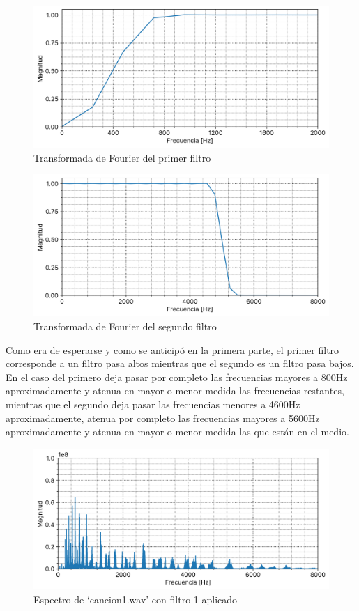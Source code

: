\documentclass[12pt]{article}
\begin{document}
\begin{figure}[H]
\centering
\includegraphics{plot/filter1_h_fft.png}
\caption{Transformada de Fourier del primer filtro}
\label{filter1_h_fft}
\end{figure}

\begin{figure}[H]
\centering
\includegraphics{plot/filter2_h_fft.png}
\caption{Transformada de Fourier del segundo filtro}
\label{filter2_h_fft}
\end{figure}

Como era de esperarse y como se anticipó en la primera parte, el primer filtro corresponde a un filtro pasa altos mientras que el segundo es un filtro pasa bajos. En el caso del primero deja pasar por completo las frecuencias mayores a 800Hz aproximadamente y atenua en mayor o menor medida las frecuencias restantes, mientras que el segundo deja pasar las frecuencias menores a 4600Hz aproximadamente, atenua por completo las frecuencias mayores a 5600Hz aproximadamente y atenua en mayor o menor medida las que están en el medio.

\begin{figure}[H]
\centering
\includegraphics{plot/cancion1_filter1_output_fft.png}
\caption{Espectro de `cancion1.wav' con filtro 1 aplicado}
\label{cancion1_filter1_output_fft}
\end{figure}
\end{document}
